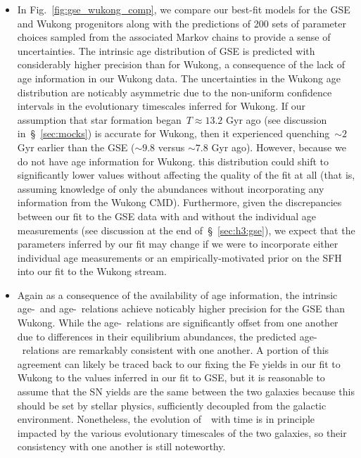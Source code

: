 \documentclass[ms.tex]{subfiles}
\begin{document}
\begin{itemize}
	\item In Fig.~\ref{fig:gse_wukong_comp}, we compare our best-fit
	models for the GSE and Wukong progenitors along with the predictions of 200
	sets of parameter choices sampled from the associated Markov chains to
	provide a sense of uncertainties.
	The intrinsic age distribution of GSE is predicted with considerably higher
	precision than for Wukong, a consequence of the lack of age information in
	our Wukong data.
	The uncertainties in the Wukong age distribution are noticably asymmetric
	due to the non-uniform confidence intervals in the evolutionary timescales
	inferred for Wukong.
	If our assumption that star formation began~$T \approx 13.2$ Gyr ago (see
	discussion in~\S~\ref{sec:mocks}) is accurate for Wukong, then it
	experienced quenching~$\sim2$ Gyr earlier than the GSE ($\sim9.8$ versus
	$\sim7.8$ Gyr ago).
	However, because we do not have age information for Wukong. this
	distribution could shift to significantly lower values without affecting
	the quality of the fit at all (that is, assuming knowledge of only the
	abundances without incorporating any information from the Wukong CMD).
	Furthermore, given the discrepancies between our fit to the GSE data with
	and without the individual age measurements (see discussion at the end
	of~\S~\ref{sec:h3:gse}), we expect that the parameters inferred by our fit
	may change if we were to incorporate either individual age measurements or
	an empirically-motivated prior on the SFH into our fit to the Wukong stream.

	\item Again as a consequence of the availability of age information, the
	intrinsic age-\feh~and age-\afe~relations achieve noticably higher
	precision for the GSE than Wukong.
	While the age-\feh~relations are significantly offset from one another due
	to differences in their equilibrium abundances, the predicted
	age-\feh~relations are remarkably consistent with one another.
	A portion of this agreement can likely be traced back to our fixing the
	Fe yields in our fit to Wukong to the values inferred in our fit to GSE,
	but it is reasonable to assume that the SN yields are the same between the
	two galaxies because this should be set by stellar physics, sufficiently
	decoupled from the galactic environment.
	Nonetheless, the evolution of~\afe~with time is in principle impacted by
	the various evolutionary timescales of the two galaxies, so their
	consistency with one another is still noteworthy.


\end{itemize}
\end{document}
